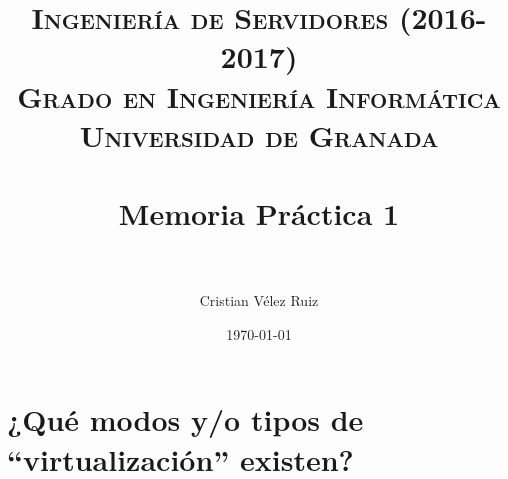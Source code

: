 


\title{	
\normalfont \normalsize 
\textsc{\textbf{Ingeniería de Servidores (2016-2017)} \\ Grado en Ingeniería Informática \\ Universidad de Granada} \\ [25pt] %
\horrule{0.5pt} \\[0.4cm] %
\huge Memoria Práctica 1 \\ %
\horrule{2pt} \\[0.5cm] %
}

\author{Cristian Vélez Ruiz} %

\date{\normalsize\today} %




\maketitle %

\newpage %

\tableofcontents %

\listoffigures

\listoftables

\newpage


\section{¿Qué modos y/o tipos de “virtualización” existen?}

